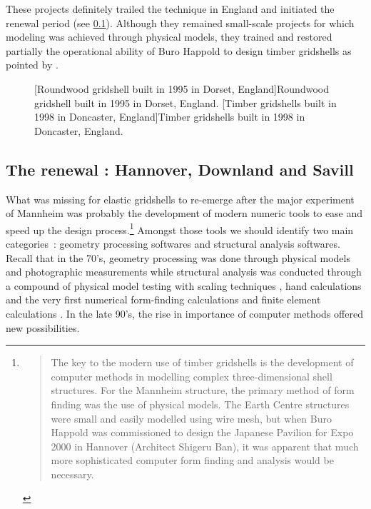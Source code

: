 These projects definitely trailed the technique in England and initiated the renewal period (see \cref{sec:renewal}). Although they remained small-scale projects for which modeling was achieved through physical models, they trained and restored partially the operational ability of Buro Happold to design timber gridshells as pointed by \citet{Harris2003}.

\begin{figure}[t]
     	\centering
		\hspace*{\fill}
		\vspace{10pt}
		[Roundwood gridshell built in 1995 in Dorset, England]{Roundwood gridshell built in 1995 in Dorset, England.}
		\label{fig:dorset}    
		\vspace{0.5cm}
		\hspace*{\fill}
		\vspace{10pt}
		[Timber gridshells built in 1998 in Doncaster, England]{Timber gridshells built in 1998 in Doncaster, England.}
		\label{fig:doncaster}    
\end{figure}

\subsection{The renewal : Hannover, Downland and Savill}
\label{sec:renewal}

What was missing for elastic gridshells to re-emerge after the major experiment of Mannheim was probably the development of modern numeric tools to ease and speed up the design process.\footnote{\blockcquote[]{Harris2003}{The key to the modern use of timber gridshells is the development of computer methods in modelling complex three-dimensional shell structures. For the Mannheim structure, the primary method of form finding was the use of physical models. The Earth Centre structures were small and easily modelled using wire mesh, but when Buro Happold was commissioned to design the Japanese Pavilion for Expo 2000 in Hannover (Architect Shigeru Ban), it was apparent that much more sophisticated computer form finding and analysis would be necessary.}} Amongst those tools we should identify two main categories~: geometry processing softwares and structural analysis softwares. Recall that in the 70's, geometry processing was done through physical models and photographic measurements \cite[pp.~130-135]{IL10} while structural analysis was conducted through a compound of physical model testing with scaling techniques \cite[pp.~130-135]{IL13}, hand calculations and the very first numerical form-finding calculations \cite[pp.~184-193]{IL10} and finite element calculations \cite[pp.~210-217]{IL10}. In the late 90's, the rise in importance of computer methods offered new possibilities.


